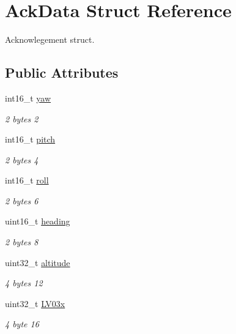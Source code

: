 \hypertarget{structAckData}{}\section{Ack\+Data Struct Reference}
\label{structAckData}


Acknowlegement struct.  


\subsection*{Public Attributes}
\begin{DoxyCompactItemize}
\item 
int16\+\_\+t \mbox{\hyperlink{structAckData_ae33faf57319caab2179b12d7ed22dee7}{yaw}}
\begin{DoxyCompactList}\small\item\em 2 bytes 2 \end{DoxyCompactList}\item 
int16\+\_\+t \mbox{\hyperlink{structAckData_a1bbf988ac7e1bf34f0d932c5cfa10740}{pitch}}
\begin{DoxyCompactList}\small\item\em 2 bytes 4 \end{DoxyCompactList}\item 
int16\+\_\+t \mbox{\hyperlink{structAckData_a9927c12b1934c847ddc3726f0d400208}{roll}}
\begin{DoxyCompactList}\small\item\em 2 bytes 6 \end{DoxyCompactList}\item 
uint16\+\_\+t \mbox{\hyperlink{structAckData_a66b0ebcdeb3e0e59bcef03b1d4016950}{heading}}
\begin{DoxyCompactList}\small\item\em 2 bytes 8 \end{DoxyCompactList}\item 
uint32\+\_\+t \mbox{\hyperlink{structAckData_acecd408a738b38414650ba1fc89d8bf3}{altitude}}
\begin{DoxyCompactList}\small\item\em 4 bytes 12 \end{DoxyCompactList}\item 
uint32\+\_\+t \mbox{\hyperlink{structAckData_a954849d2888715136c6e5cc2e9808ad5}{L\+V03x}}
\begin{DoxyCompactList}\small\item\em 4 byte 16 \end{DoxyCompactList}\item 

\end{DoxyCompactItemize}
